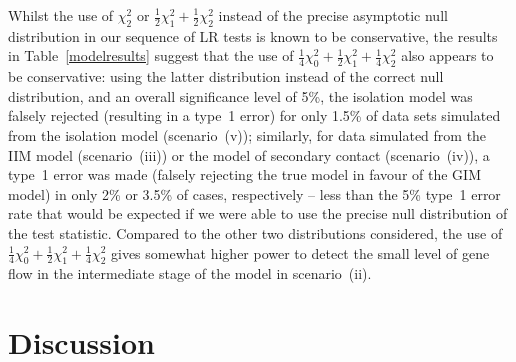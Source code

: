 \documentclass[11pt]{article}
\begin{document}
Whilst the use of $\chi^2_2$ or $\frac{1}{2} \chi^2_1 +\frac{1}{2} \chi^2_2$ instead of the precise asymptotic null distribution in our sequence of LR tests is known to be conservative, the results in Table~\ref{modelresults} suggest that the use of $\frac{1}{4} \chi^2_0 +\frac{1}{2} \chi^2_1 +\frac{1}{4} \chi^2_2$ also appears to be conservative: using the latter distribution instead of the correct null distribution, and an overall significance level of 5\%, the isolation model was falsely rejected (resulting in a type~1 error) for only 1.5\% of data sets simulated from the isolation model (scenario~(v)); similarly, for data simulated from the IIM model (scenario~(iii)) 
{\color{red}
or the model of secondary contact (scenario~(iv)), a type~1 error was made (falsely rejecting the true model in favour of the GIM model) in only 2\% or 3.5\% of cases, respectively
}
-- less than the 5\% type~1 error rate that would be expected if we were able to use the precise null distribution of the test statistic. 
Compared to the other two distributions considered, the use of $\frac{1}{4} \chi^2_0 +\frac{1}{2} \chi^2_1 +\frac{1}{4} \chi^2_2$ 
gives somewhat higher power to detect the small level of gene flow in the intermediate stage of the model in scenario~(ii).


\section{Discussion}
\end{document}
